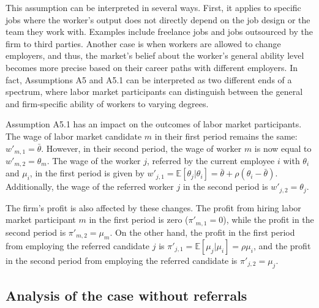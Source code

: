 \documentclass[12pt]{article}
\begin{document}
This assumption can be interpreted in several ways. First, it applies to specific jobs where the worker's output does not directly depend on the job design or the team they work with. Examples include freelance jobs and jobs outsourced by the firm to third parties. Another case is when workers are allowed to change employers, and thus, the market's belief about the worker's general ability level becomes more precise based on their career paths with different employers. In fact, Assumptions A5 and A5.1 can be interpreted as two different ends of a spectrum, where labor market participants can distinguish between the general and firm-specific ability of workers to varying degrees.

Assumption A5.1 has an impact on the outcomes of labor market participants. The wage of labor market candidate $m$ in their first period remains the same: $w'_{m,1} = \bar{\theta}$. However, in their second period, the wage of worker $m$ is now equal to $w'_{m,2} = \theta_m$. The wage of the worker $j$, referred by the current employee $i$ with $\theta_i$ and $\mu_i$, in the first period is given by $w'_{j,1} = \mathbb{E}[\theta_j | \theta_i] = \bar{\theta} + \rho(\theta_i - \bar{\theta})$. Additionally, the wage of the referred worker $j$ in the second period is $w'_{j,2} = \theta_j$.

The firm's profit is also affected by these changes. The profit from hiring labor market participant $m$ in the first period is zero ($\pi'_{m,1} = 0$), while the profit in the second period is $\pi'_{m,2} = \mu_m$. On the other hand, the profit in the first period from employing the referred candidate $j$ is $\pi'_{j,1} = \mathbb{E}[\mu_j|\mu_i] = \rho\mu_i$, and the profit in the second period from employing the referred candidate is $\pi'_{j,2} = \mu_j$.

\subsection{Analysis of the case without referrals}
\end{document}
